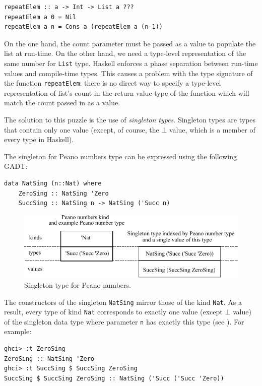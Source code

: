 \documentclass{tmr}
\newcommand{\italic}[1]{\textit{#1}}
\begin{document}
\begin{Verbatim}
repeatElem :: a -> Int -> List a ???
repeatElem a 0 = Nil
repeatElem a n = Cons a (repeatElem a (n-1))
\end{Verbatim}

On the one hand, the count parameter must be passed as a value to populate the list at run-time. On the other hand, we need a type-level representation of the same number for \verb|List| type. Haskell enforces a phase separation between run-time values and compile-time types. This causes a problem with the type signature of the function \verb|repeatElem|: there is no direct way to specify a type-level representation of list's count in the return value type of the function which will match the count passed in as a value.

The solution to this puzzle is the use of \italic{singleton types}. Singleton types are types that contain only one value (except, of course, the $\bot$ value, which is a member of every type in Haskell).

The singleton for Peano numbers type can be expressed using the following GADT:

\begin{Verbatim}
data NatSing (n::Nat) where
    ZeroSing :: NatSing 'Zero
    SuccSing :: NatSing n -> NatSing ('Succ n)
\end{Verbatim}

\begin{figure}
\centering
\includegraphics{singleton}
\vspace{5pt}
\caption{Singleton type for Peano numbers.}
\label{fig:singleton}
\end{figure}

The constructors of the singleton \verb|NatSing| mirror those of the kind \verb|Nat|. As a result, every type of kind \verb|Nat| corresponds to exactly one value (except $\bot$ value) of the singleton data type where parameter \verb|n| has exactly this type (see ). For example:

\begin{Verbatim}
ghci> :t ZeroSing
ZeroSing :: NatSing 'Zero
ghci> :t SuccSing $ SuccSing ZeroSing
SuccSing $ SuccSing ZeroSing :: NatSing ('Succ ('Succ 'Zero))
\end{Verbatim}
\end{document}
